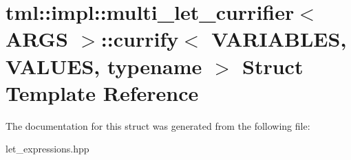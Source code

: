 \hypertarget{structtml_1_1impl_1_1multi__let__currifier_1_1currify}{\section{tml\+:\+:impl\+:\+:multi\+\_\+let\+\_\+currifier$<$ A\+R\+G\+S $>$\+:\+:currify$<$ V\+A\+R\+I\+A\+B\+L\+E\+S, V\+A\+L\+U\+E\+S, typename $>$ Struct Template Reference}
\label{structtml_1_1impl_1_1multi__let__currifier_1_1currify}
}


The documentation for this struct was generated from the following file\+:\begin{DoxyCompactItemize}
\item 
let\+\_\+expressions.\+hpp\end{DoxyCompactItemize}
